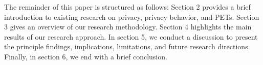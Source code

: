 The remainder of this paper is structured as follows: Section 2 provides a brief introduction to existing research on privacy, privacy behavior, and PETs. Section 3 gives an overview of our research methodology. Section 4 highlights the main results of our research approach. In section 5, we conduct a discussion to present the principle findings, implications, limitations, and future research directions. Finally, in section 6, we end with a brief conclusion.



